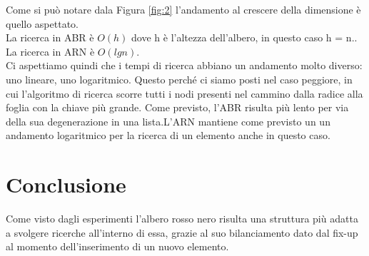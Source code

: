 \documentclass[12pt]{article}
\begin{document}
Come si può notare dala Figura \ref{fig:2} l'andamento al crescere della dimensione è quello aspettato.\\
La ricerca in ABR è $O(h)$ dove h è l'altezza dell'albero, in questo caso h = n..\\
La ricerca in ARN è $O(lg n)$.\\
Ci aspettiamo quindi che i tempi di ricerca abbiano un andamento molto diverso: uno lineare, uno logaritmico.
Questo perché ci siamo posti nel caso peggiore, in cui l'algoritmo di ricerca scorre tutti i nodi presenti nel cammino dalla radice alla foglia con la chiave più grande.
Come previsto, l'ABR risulta più lento per via della sua degenerazione in una lista.L'ARN mantiene come previsto un un andamento logaritmico per la ricerca di un elemento anche in questo caso. 

\section{Conclusione}
Come visto dagli esperimenti l’albero rosso nero risulta una struttura più adatta a svolgere ricerche all’interno di essa, grazie al suo bilanciamento dato dal fix-up al momento dell’inserimento di un nuovo elemento.
\end{document}
